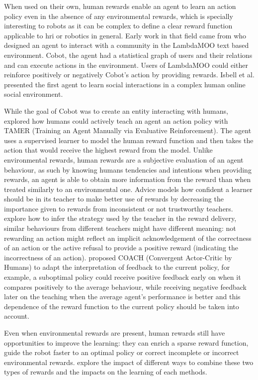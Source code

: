 When used on their own, human rewards enable an agent to learn an action policy even in the absence of any environmental rewards, which is specially interesting to robots as it can be complex to define a clear reward function applicable to \gls{hri} or robotics in general. Early work in that field came from \cite{isbell2006cobot} who designed an agent to interact with a community in the LambdaMOO text based environment. Cobot, the agent had a statistical graph of users and their relations and can execute actions in the environment. Users of LambdaMOO could either reinforce positively or negatively Cobot's action by providing rewards. Isbell et al. presented the first agent to learn social interactions in a complex human online social environment. 

While the goal of Cobot was to create an entity interacting with humans, \cite{knox2009interactively} explored how humans could actively teach an agent an action policy with TAMER (Training an Agent Manually via Evaluative Reinforcement). The agent uses a supervised learner to model the human reward function and then takes the action that would receive the highest reward from the model. Unlike environmental rewards, human rewards are a subjective evaluation of an agent behaviour, as such by knowing humans tendencies and intentions when providing rewards, an agent is able to obtain more information from the reward than when treated similarly to an environmental one. Advice \citep{griffith2013policy} models how confident a learner should be in its teacher to make better use of rewards by decreasing the importance given to rewards from inconsistent or not trustworthy teachers. \cite{loftin2016learning} explore how to infer the strategy used by the teacher in the reward delivery, similar behaviours from different teachers might have different meaning: not rewarding an action might reflect an implicit acknowledgement of the correctness of an action or the active refusal to provide a positive reward (indicating the incorrectness of an action). \cite{macglashan2017interactive} proposed COACH (Convergent Actor-Critic by Humans) to adapt the interpretation of feedback to the current policy, for example, a suboptimal policy could receive positive feedback early on when it compares positively to the average behaviour, while receiving negative feedback later on the teaching when the average agent's performance is better and this dependence of the reward function to the current policy should be taken into account.

Even when environmental rewards are present, human rewards still have opportunities to improve the learning: they can enrich a sparse reward function, guide the robot faster to an optimal policy or correct incomplete or incorrect environmental rewards. \cite{knox2010combining} explore the impact of different ways to combine these two types of rewards and the impacts on the learning of each methods.

